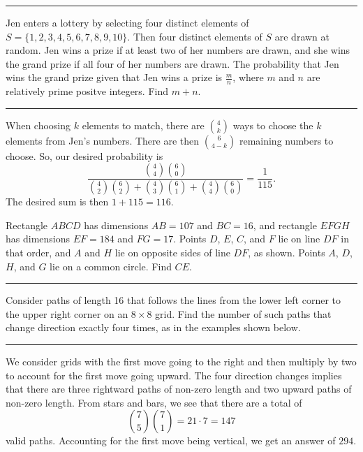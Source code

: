 \documentclass[11pt]{scrartcl}
\begin{document}
\rule{\textwidth}{0.4pt}

\pagebreak

\begin{problem}
    Jen enters a lottery by selecting four distinct elements of $S = \{1, 2, 3, 4, 5, 6, 7, 8, 9, 10\}$. Then four distinct elements of $S$ are drawn at random. Jen wins a prize if at least two of her numbers are drawn, and she wins the grand prize if all four of her numbers are drawn. The probability that Jen wins the grand prize given that Jen wins a prize is $\frac{m}{n}$, where $m$ and $n$ are relatively prime positve integers. Find $m + n$.
\end{problem}

\rule{\textwidth}{0.4pt}

When choosing $k$ elements to match, there are ${4 \choose k}$ ways to choose the $k$ elements from Jen's numbers. There are then ${6 \choose 4 - k}$ remaining numbers to choose. So, our desired probability is
\[\frac{{4 \choose 4}{6 \choose 0}}{{4 \choose 2}{6 \choose 2} + {4 \choose 3}{6 \choose 1} + {4 \choose 4}{6 \choose 0}} = \frac{1}{115}.\]
The desired sum is then $1 + 115 = \boxed{116}$.

\pagebreak

\begin{problem}
    Rectangle $ABCD$ has dimensions $AB = 107$ and $BC = 16$, and rectangle $EFGH$ has dimensions $EF = 184$ and $FG = 17$. Points $D$, $E$, $C$, and $F$ lie on line $DF$ in that order, and $A$ and $H$ lie on opposite sides of line $DF$, as shown. Points $A$, $D$, $H$, and $G$ lie on a common circle. Find $CE$.
\end{problem}

\rule{\textwidth}{0.4pt}

\pagebreak

\begin{problem}
    Consider paths of length 16 that follows the lines from the lower left corner to the upper right corner on an $8 \times 8$ grid. Find the number of such paths that change direction exactly four times, as in the examples shown below.
\end{problem}

\rule{\textwidth}{0.4pt}

We consider grids with the first move going to the right and then multiply by two to account for the first move going upward. The four direction changes implies that there are three rightward paths of non-zero length and two upward paths of non-zero length. From stars and bars, we see that there are a total of
\[{7 \choose 5}{7 \choose 1} = 21 \cdot 7 = 147\]
valid paths. Accounting for the first move being vertical, we get an answer of $\boxed{294}$.
\end{document}
